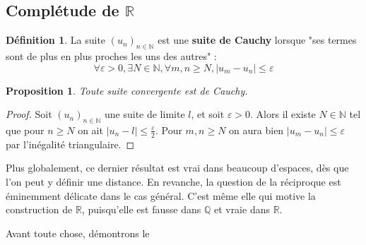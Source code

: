 \documentclass[french]{book}
\theoremstyle{plain}
\newtheorem{prop}{Proposition}[chapter]
\theoremstyle{definition}
\newtheorem{dfn}{Définition}[chapter]
\theoremstyle{remark}
\begin{document}
\subsection{Complétude de $\mathbb{R}$}

\begin{dfn}
	La suite $(u_n)_{n \in \mathbb{N}}$ est une \textbf{suite de Cauchy }lorsque "ses termes sont de plus en plus proches les uns des autres" : $$\forall \varepsilon > 0, \exists N \in \mathbb{N}, \forall m, n \geqslant N, |u_m - u_n| \leqslant \varepsilon$$
\end{dfn}
\begin{prop}
	Toute suite convergente est de Cauchy.
\end{prop}
\begin{proof}
	Soit $(u_n)_{n \in \mathbb{N}}$ une suite de limite $l$, et soit $\varepsilon > 0$. Alors il existe $N \in \mathbb{N}$ tel que pour $n \geqslant N$ on ait $\displaystyle|u_n - l| \leqslant \frac{\varepsilon}{2}$. Pour $m, n \geqslant N$ on aura bien $|u_m - u_n| \leqslant \varepsilon$ par l'inégalité triangulaire.
\end{proof}
Plus globalement, ce dernier résultat est vrai dans beaucoup d'espaces, dès que l'on peut y définir une distance. En revanche, la question de la réciproque est éminemment délicate dans le cas général. C'est même elle qui motive la construction de $\mathbb{R}$, puisqu'elle est fausse dans $\mathbb{Q}$ et vraie dans $\mathbb{R}$. \par Avant toute chose, démontrons le
\end{document}
